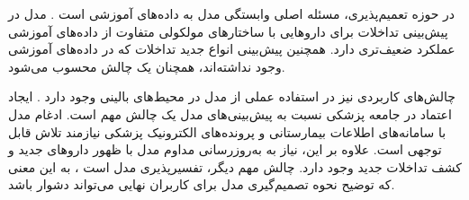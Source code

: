 در حوزه تعمیم‌پذیری، مسئله اصلی وابستگی مدل به داده‌های آموزشی است \cite{ref_dai2020}. مدل در پیش‌بینی تداخلات برای داروهایی با ساختارهای مولکولی متفاوت از داده‌های آموزشی عملکرد ضعیف‌تری دارد. همچنین پیش‌بینی انواع جدید تداخلات که در داده‌های آموزشی وجود نداشته‌اند، همچنان یک چالش محسوب می‌شود.

چالش‌های کاربردی نیز در استفاده عملی از مدل در محیط‌های بالینی وجود دارد \cite{ref_cascorbi2012}. ایجاد اعتماد در جامعه پزشکی نسبت به پیش‌بینی‌های مدل یک چالش مهم است. ادغام مدل با سامانه‌های اطلاعات بیمارستانی و پرونده‌های الکترونیک پزشکی نیازمند تلاش قابل توجهی است. علاوه بر این، نیاز به به‌روزرسانی مداوم مدل با ظهور داروهای جدید و کشف تداخلات جدید وجود دارد. چالش مهم دیگر، تفسیرپذیری مدل است \cite{ref_ryu2018}، به این معنی که توضیح نحوه تصمیم‌گیری مدل برای کاربران نهایی می‌تواند دشوار باشد.
